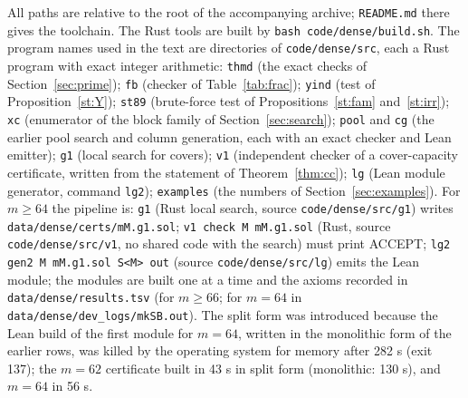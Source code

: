 \documentclass[11pt]{article}
\theoremstyle{remark}
\begin{document}
All paths are relative to the root of the accompanying archive; \texttt{README.md} there gives the toolchain. The Rust tools are built by \texttt{bash code/dense/build.sh}. The program names used in the text are directories of \texttt{code/dense/src}, each a Rust program with exact integer arithmetic: \texttt{thmd} (the exact checks of Section~\ref{sec:prime}); \texttt{fb} (checker of Table~\ref{tab:frac}); \texttt{yind} (test of Proposition~\ref{st:Y}); \texttt{st89} (brute-force test of Propositions~\ref{st:fam} and~\ref{st:irr}); \texttt{xc} (enumerator of the block family of Section~\ref{sec:search}); \texttt{pool} and \texttt{cg} (the earlier pool search and column generation, each with an exact checker and Lean emitter); \texttt{g1} (local search for covers); \texttt{v1} (independent checker of a cover-capacity certificate, written from the statement of Theorem~\ref{thm:cc}); \texttt{lg} (Lean module generator, command \texttt{lg2}); \texttt{examples} (the numbers of Section~\ref{sec:examples}). For $m\ge64$ the pipeline is: \texttt{g1} (Rust local search, source \texttt{code/dense/src/g1}) writes \texttt{data/dense/certs/mM.g1.sol}; \texttt{v1 check M mM.g1.sol} (Rust, source \texttt{code/dense/src/v1}, no shared code with the search) must print ACCEPT; \texttt{lg2 gen2 M mM.g1.sol S<M> out} (source \texttt{code/dense/src/lg}) emits the Lean module; the modules are built one at a time and the axioms recorded in \texttt{data/dense/results.tsv} (for $m\ge66$; for $m=64$ in \texttt{data/dense/dev\_logs/mkSB.out}). The split form was introduced because the Lean build of the first module for $m=64$, written in the monolithic form of the earlier rows, was killed by the operating system for memory after 282 s (exit 137); the $m=62$ certificate built in 43 s in split form (monolithic: 130 s), and $m=64$ in 56 s.
\end{document}
